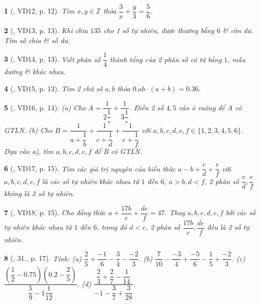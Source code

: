 \documentclass{article}
\newtheorem{baitoan}{}
\begin{document}
\begin{baitoan}[\cite{Binh_Toan_6_tap_2}, VD12, p. 12]
	Tìm $x,y\in\mathbb{Z}$ thỏa $\dfrac{3}{x} + \dfrac{y}{3} = \dfrac{5}{6}$.
\end{baitoan}

\begin{baitoan}[\cite{Binh_Toan_6_tap_2}, VD13, p. 13]
	Khi chia $135$ cho 1 số tự nhiên, được thương bằng $6$ \& còn dư. Tìm số chia \& số dư.
\end{baitoan}

\begin{baitoan}[\cite{Binh_Toan_6_tap_2}, VD14, p. 13]
	Viết phân số $\dfrac{1}{4}$ thành tổng của 2 phân số có tử bằng $1$, mẫu dương \& khác nhau.
\end{baitoan}

\begin{baitoan}[\cite{Binh_Toan_6_tap_2}, VD15, p. 13]
	Tìm 2 chữ số $a,b$ thỏa $\overline{0.ab}\cdot(a + b) = 0.36$.
\end{baitoan}

\begin{baitoan}[\cite{Binh_Toan_6_tap_2}, VD16, p. 14]
	(a) Cho $A = \dfrac{1}{2\dfrac{1}{\square}} + \dfrac{1}{3\dfrac{1}{\square}}$. Điền 2 số $4,5$ vào ô vuông để A có {\rm GTLN}. (b) Cho $B = \dfrac{1}{a + \dfrac{1}{b}} + \dfrac{1}{c + \dfrac{1}{d}} + \dfrac{1}{e + \dfrac{1}{f}}$ với $a,b,c,d,e,f\in\{1,2,3,4,5,6\}$. Dựa vào a), tìm $a,b,c,d,e,f$ để B có {\rm GTLN}.
\end{baitoan}

\begin{baitoan}[\cite{Binh_Toan_6_tap_2}, VD17, p. 15]
	Tìm các giá trị nguyên của biểu thức $a - b + \dfrac{c}{d} + \dfrac{e}{f}$ với $a,b,c,d,e,f$ là các số tự nhiên khác nhau từ $1$ đến $6$, $a > b,d < f$, 2 phân số $\dfrac{c}{d},\dfrac{e}{f}$ không là 2 số tự nhiên.
\end{baitoan}

\begin{baitoan}[\cite{Binh_Toan_6_tap_2}, VD18, p. 15]
	Cho đẳng thức $a + \dfrac{17b}{c} + \dfrac{de}{f} = 47$. Thay $a,b,c,d,e,f$ bởi các số tự nhiên khác nhau từ $1$ đến $6$, trong đó $d < e$, 2 phân số $\dfrac{17b}{c},\dfrac{de}{f}$ đều là 2 số tự nhiên.
\end{baitoan}

\begin{baitoan}[\cite{Binh_Toan_6_tap_2}, 31., p. 17]
	Tính: (a) $\dfrac{2}{5} + \dfrac{-1}{6} - \dfrac{3}{4} - \dfrac{-2}{3}$. (b) $\dfrac{7}{10} - \dfrac{-3}{4} + \dfrac{-5}{6} - \dfrac{1}{5} + \dfrac{-2}{3}$. (c) $\dfrac{\left(\dfrac{1}{2} - 0.75\right)\left(0.2 - \dfrac{2}{5}\right)}{\dfrac{5}{9} - 1\dfrac{1}{12}}$. (d) $\dfrac{\dfrac{2}{3} + \dfrac{2}{7} - \dfrac{1}{14}}{-1 - \dfrac{3}{7} + \dfrac{3}{28}}$.
\end{baitoan}
\end{document}
